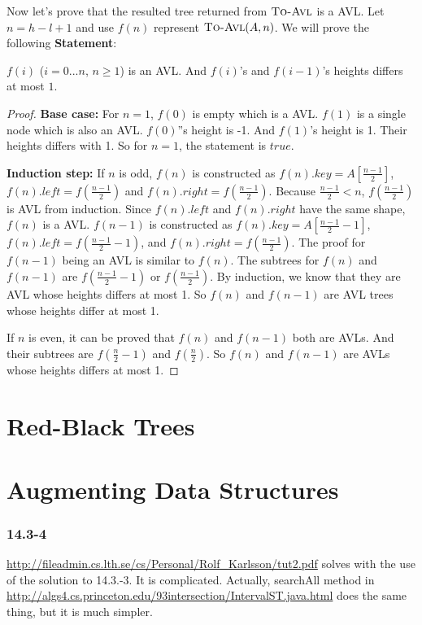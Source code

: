 \documentclass{book}
\begin{document}
\begin{CJK}{UTF8}{gkai}
Now let's prove that the resulted tree returned from $\textnormal{\scshape To-Avl}$ is a AVL. 
Let $n = h-l+1$ and use $f(n)$ represent $\textnormal{\scshape To-Avl}(A, n)$. We will prove 
the following \textbf{Statement}:

$f(i)$ ($i = 0...n$, $n \ge 1$) is an AVL. And $f(i)$'s and $f(i-1)$'s heights 
differs at most $1$.

\begin{proof} \textbf{Base case:} For $n = 1$, $f(0)$ is empty which is 
  a AVL. $f(1)$ is a single node which is also an AVL. $f(0)$''s height is -1.
  And $f(1)$'s height is 1. Their heights differs with 1. So for $n = 1$, the 
  statement is $true$. 

\textbf{Induction step:} 
If $n$ is odd, $f(n)$ is constructed as $f(n).key = A[\frac{n-1}{2}]$, 
$f(n).left = f(\frac{n-1}{2})$ and $f(n).right = f(\frac{n-1}{2})$. Because 
$\frac{n-1}{2} < n$, $f(\frac{n-1}{2})$ is AVL from induction.
Since $f(n).left$ and $f(n).right$ have the same shape, $f(n)$ is a AVL. 
$f(n-1)$ is constructed as $f(n).key = A[\frac{n-1}{2}-1]$, $f(n).left = 
f(\frac{n-1}{2}-1)$, and $f(n).right = f(\frac{n-1}{2})$. The proof for $f(n-1)$ 
being an AVL is similar to $f(n)$. The subtrees for $f(n)$ and $f(n-1)$ are 
$f(\frac{n-1}{2}-1)$ or $f(\frac{n-1}{2})$. By induction, we know that they are 
AVL whose heights differs at most 1. So $f(n)$ and $f(n-1)$ are AVL trees whose 
heights differ at most 1.

If $n$ is even, it can be proved that $f(n)$ and $f(n-1)$ both are AVLs. And their 
subtrees are $f(\frac{n}{2}-1)$ and $f(\frac{n}{2})$. So $f(n)$ and $f(n-1)$ 
are AVLs whose heights differs at most 1.
\end{proof}


\chapter{Red-Black Trees}
\chapter{Augmenting Data Structures}

\subsection*{14.3-4}
\url{http://fileadmin.cs.lth.se/cs/Personal/Rolf_Karlsson/tut2.pdf} solves with
the use of the solution to 14.3.-3. It is complicated. Actually, searchAll method in
\url{http://algs4.cs.princeton.edu/93intersection/IntervalST.java.html} does the
same thing, but it is much simpler.


\end{CJK}
\end{document}
